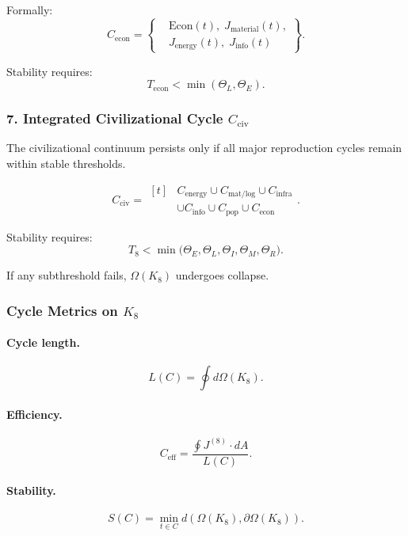 Formally:
\[
 C_{\mathrm{econ}}=
 \left\{
 \begin{aligned}
   &\mathrm{Econ}(t),\;
    J_{\mathrm{material}}(t),\\
   &J_{\mathrm{energy}}(t),\;
    J_{\mathrm{info}}(t)
 \end{aligned}
  \right\}.
\]

Stability requires:
\[
  T_{\mathrm{econ}} < \min(\Theta_L, \Theta_E).
\]

\subsubsection{7. Integrated Civilizational Cycle $C_{\mathrm{civ}}$}

The civilizational continuum persists only if all major reproduction cycles
remain within stable thresholds.

\[
 C_{\mathrm{civ}}
   = \begin{aligned}[t]
     &C_{\mathrm{energy}}
      \cup C_{\mathrm{mat/log}}
      \cup C_{\mathrm{infra}}\\
     &\cup C_{\mathrm{info}}
      \cup C_{\mathrm{pop}}
      \cup C_{\mathrm{econ}}
   \end{aligned}
   .
\]

Stability requires:
\[
  T_8
   <
   \min\!\bigl(\Theta_E,\Theta_L,\Theta_I,\Theta_M,\Theta_R\bigr).
\]

If any subthreshold fails, $\Omega(K_8)$ undergoes collapse.

\subsubsection{Cycle Metrics on \texorpdfstring{$K_8$}{K_8}}

\paragraph{Cycle length.}
\[
  L(C) = \oint d\Omega(K_8).
\]

\paragraph{Efficiency.}
\[
  C_{\mathrm{eff}}
  = \frac{\oint J^{(8)}\cdot dA}{L(C)}.
\]

\paragraph{Stability.}
\[
  S(C)
    = \min_{t\in C}
      d(\Omega(K_8),\partial\Omega(K_8)).
\]

